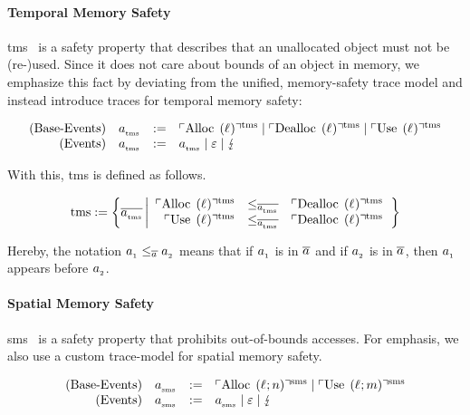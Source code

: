 \documentclass[a4paper,12pt]{article}
\begin{document}
\paragraph{Temporal Memory Safety}

\gls*{tms}~\cite{nagarakatte2010cets} is a safety property that describes that an unallocated object must not be (re-)used.
Since it does not care about bounds of an object in memory, we emphasize this fact by deviating from the unified, memory-safety trace model and instead introduce traces for temporal memory safety:
\begin{definition}{}
\[
  \begin{array}{rcll}
    \text{(Base-Events)}&\tmsEvent &:=& \tmsAlloc \mid \tmsDealloc \mid \tmsUse \\
    \text{(Events)}&\tmsEvent &:=& \tmsEvent \mid \emptyevent \mid \lightning \\ 
  \end{array}
\]
\end{definition}

With this, \gls*{tms} is defined as follows.
\begin{definition}{}
  \[
  \tmssafe:=\left\{\tmsTrace
    \left| 
      \begin{array}{rcl}
        \tmsAlloc&\le_{\tmsTrace}&\tmsDealloc \\
        \tmsUse&\le_{\tmsTrace}&\tmsDealloc \\
      \end{array}
    \right.
  \right\}
  \]
\end{definition}
Hereby, the notation $\varEvent[_{1}]\le_{\varTrace}\varEvent[_{2}]$ means that if $\varEvent[_{1}]$ is in $\varTrace$ and if $\varEvent[_{2}]$ is in $\varTrace$, then $\varEvent[_{1}]$ appears before $\varEvent[_{2}]$.

\paragraph{Spatial Memory Safety}
\gls*{sms}~\cite{nagarakatte2009soft} is a safety property that prohibits out-of-bounds accesses.
For emphasis, we also use a custom trace-model for spatial memory safety.
\begin{definition}{}
\[
  \begin{array}{rcll}
    \text{(Base-Events)}&\smsEvent &:=& \smsAlloc \mid \smsUse \\
    \text{(Events)}&\smsEvent &:=& \smsEvent \mid \emptyevent \mid \lightning \\ 
  \end{array}
\]
\end{definition}
\end{document}
